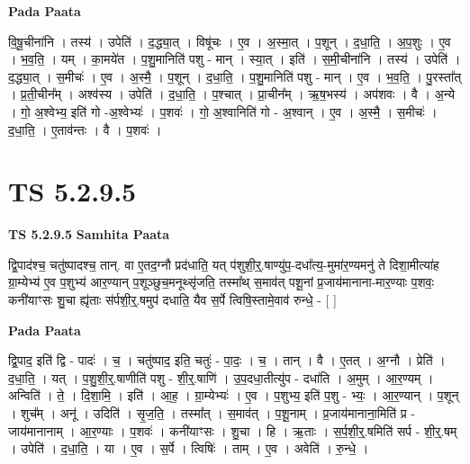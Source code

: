 \documentclass[17pt]{extarticle}
\begin{document}
\textbf{Pada Paata} \newline

वि॒षू॒चीना॑नि । तस्य॑ । उपेति॑ । द॒द्ध्या॒त् । विषू॑चः । ए॒व । अ॒स्मा॒त् । प॒शून् । द॒धा॒ति॒ । अ॒प॒शुः । ए॒व । भ॒व॒ति॒ । यम् । का॒मये॑त । प॒शु॒मानिति॑ पशु - मान् । स्या॒त् । इति॑ । स॒मी॒चीना॑नि । तस्य॑ । उपेति॑ । द॒द्ध्या॒त् । स॒मीचः॑ । ए॒व । अ॒स्मै॒ । प॒शून् । द॒धा॒ति॒ । प॒शु॒मानिति॑ पशु - मान् । ए॒व । भ॒व॒ति॒ । पु॒रस्ता᳚त् । प्र॒ती॒चीन᳚म् । अश्व॑स्य । उपेति॑ । द॒धा॒ति॒ । प॒श्चात् । प्रा॒चीन᳚म् । ऋ॒ष॒भस्य॑ । अप॑शवः । वै । अ॒न्ये । गो॒ अ॒श्वेभ्य॒ इति॑ गो -अ॒श्वेभ्यः॑ । प॒शवः॑ । गो॒ अ॒श्वानिति॑ गो - अ॒श्वान् । ए॒व । अ॒स्मै॒ । स॒मीचः॑ । द॒धा॒ति॒ । ए॒ताव॑न्तः । वै । प॒शवः॑ ।  \newline




\section*{ TS 5.2.9.5 }

\textbf{TS 5.2.9.5 } \newline
\textbf{Samhita Paata} \newline

द्वि॒पाद॑श्च॒ चतु॑ष्पादश्च॒ तान्. वा ए॒तद॒ग्नौ प्रद॑धाति॒ यत् प॑शुशी॒र्॒.षाण्यु॑प॒-दधा᳚त्य॒-मुमा॑र॒ण्यमनु॑ ते दिशा॒मीत्या॑ह ग्रा॒म्येभ्य॑ ए॒व प॒शुभ्य॑ आर॒ण्यान् प॒शूञ्छुच॒मनूथ्सृ॑जति॒ तस्मा᳚थ् स॒माव॑त् पशू॒नां प्र॒जाय॑मानाना-मार॒ण्याः प॒शवः॒ कनी॑याꣳसः शु॒चा ह्यृ॑ताः स॑र्पशी॒र्॒.षमुप॑ दधाति॒ यैव स॒र्पे त्विषि॒स्तामे॒वाव॑ रुन्धे॒ - [  ] \newline

\textbf{Pada Paata} \newline

द्वि॒पाद॒ इति॑ द्वि - पादः॑ । च॒ । चतु॑ष्पाद॒ इति॒ चतुः॑ - पा॒दः॒ । च॒ । तान् । वै । ए॒तत् । अ॒ग्नौ । प्रेति॑ । द॒धा॒ति॒ । यत् । प॒शु॒शी॒र्॒.षाणीति॑ पशु - शी॒र्॒.षाणि॑ । उ॒प॒दधा॒तीत्यु॑प - दधा॑ति । अ॒मुम् । आ॒र॒ण्यम् । अन्विति॑ । ते॒ । दि॒शा॒मि॒ । इति॑ । आ॒ह॒ । ग्रा॒म्येभ्यः॑ । ए॒व । प॒शुभ्य॒ इति॑ प॒शु - भ्यः॒ । आ॒र॒ण्यान् । प॒शून् । शुच᳚म् । अनू॑ । उदिति॑ । सृ॒ज॒ति॒ । तस्मा᳚त् । स॒माव॑त् । प॒शू॒नाम् । प्र॒जाय॑मानाना॒मिति॑ प्र - जाय॑मानानाम् । आ॒र॒ण्याः । प॒शवः॑ । कनी॑याꣳसः । शु॒चा । हि । ऋ॒ताः । स॒र्प॒शी॒र्॒.षमिति॑ सर्प - शी॒र्॒.षम् । उपेति॑ । द॒धा॒ति॒ । या । ए॒व । स॒र्पे । त्विषिः॑ । ताम् । ए॒व । अवेति॑ । रु॒न्धे॒ ।  \newline
\end{document}
